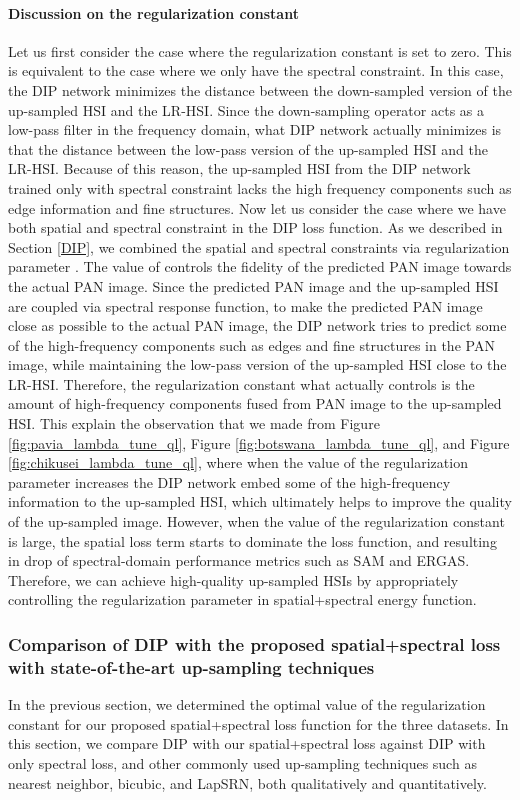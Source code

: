 \documentclass[journal]{IEEEtran}
\begin{document}
    \paragraph*{Discussion on the regularization constant } Let us first consider the case where the regularization constant  is set to zero. This is equivalent to the case where we only have the spectral constraint. In this case, the DIP network minimizes the distance between the down-sampled version of the up-sampled HSI and the LR-HSI. Since the down-sampling operator acts as a low-pass filter in the frequency domain, what DIP network actually minimizes is that the distance between the low-pass version of the up-sampled HSI and the LR-HSI. Because of this reason, the up-sampled HSI from the DIP network trained only with spectral constraint lacks the high frequency components such as edge information and fine structures. Now let us consider the case where we have both spatial and spectral constraint in the DIP loss function. As we described in Section \ref{DIP}, we combined the spatial and spectral constraints via regularization parameter . The value of  controls the fidelity of the predicted PAN image towards the actual PAN image. Since the predicted PAN image and the up-sampled HSI are coupled via spectral response function, to make the predicted PAN image close as possible to the actual PAN image, the DIP network tries to predict some of the high-frequency components such as edges and fine structures in the PAN image,  while maintaining the low-pass version of the up-sampled HSI close to the LR-HSI. Therefore, the regularization constant what actually controls is the amount of high-frequency components fused from PAN image to the up-sampled HSI. This explain the observation that we made from Figure \ref{fig:pavia_lambda_tune_ql}, Figure \ref{fig:botswana_lambda_tune_ql}, and Figure \ref{fig:chikusei_lambda_tune_ql}, where when the value of the regularization parameter increases the DIP network embed some of the high-frequency information to the up-sampled HSI, which ultimately helps to improve the quality of the up-sampled image. However, when the value of the regularization constant is large, the spatial loss term starts to dominate  the loss function, and resulting in drop of spectral-domain performance metrics such as SAM and ERGAS. Therefore, we can achieve high-quality up-sampled HSIs by appropriately controlling the regularization parameter in spatial+spectral energy function.
    
    \subsubsection{Comparison of DIP with the proposed spatial+spectral loss with state-of-the-art up-sampling techniques} In the previous section, we determined the optimal value of the regularization constant  for our proposed spatial+spectral loss function for the three datasets. In this section, we compare DIP with our spatial+spectral loss against DIP with only spectral loss, and other commonly used up-sampling techniques such as nearest neighbor, bicubic, and LapSRN, both qualitatively and quantitatively. 
    
\end{document}
